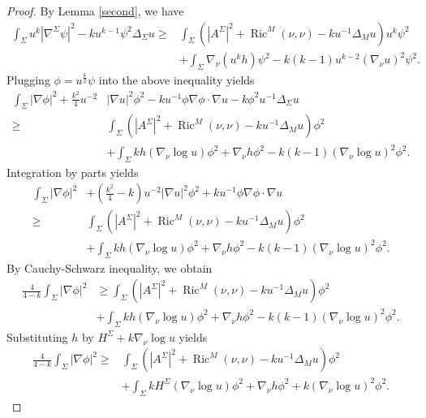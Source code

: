 \documentclass[11pt,letterpaper]{amsart}
\DeclareMathOperator{\Ric}{Ric}
\theoremstyle{definition}
\theoremstyle{remark}
\numberwithin{equation}{section}
\begin{document}
\begin{proof}
By Lemma \ref{second}, we have
\begin{equation*}
 \begin{split}
     \int_{\Sigma}u^k |\nabla^{\Sigma}\psi|^2-ku^{k-1}\psi^2\Delta_{\Sigma}u\geqslant& \int_{\Sigma} \left(|A^{\Sigma}|^2+\Ric^M(\nu, \nu)-ku^{-1}\Delta_M u\right)u^k\psi^2\\
     &+\int_{\Sigma} \nabla_\nu(u^k h)\psi^2-k(k-1)u^{k-2}(\nabla_\nu u)^2\psi^2.
     \end{split}
 \end{equation*}
Plugging $\phi=u^{\frac{k}{2}}\psi$ into the above inequality yields
 \begin{align*}
     \int_\Sigma |\nabla\phi|^2+\frac{k^2}{4}u^{-2}&|\nabla u|^2\phi^2-ku^{-1}\phi\nabla\phi\cdot\nabla u-k\phi^2u^{-1}\Delta_\Sigma u\\ 
     \geq & \int_{\Sigma} \left(|A^{\Sigma}|^2+\Ric^M(\nu, \nu)-ku^{-1}\Delta_M u\right)\phi^2\\
     &+\int_{\Sigma} kh(\nabla_\nu \log u) \phi^2+\nabla_\nu h \phi^2-k(k-1)(\nabla_\nu \log u)^2\phi^2.
 \end{align*}
 Integration by parts yields
 \begin{align*}
     \int_\Sigma |\nabla\phi|^2&+\left(\frac{k^2}{4}-k\right)u^{-2}|\nabla u|^2\phi^2+ku^{-1}\phi\nabla\phi\cdot\nabla u\\ \geq & \int_{\Sigma} \left(|A^{\Sigma}|^2+\Ric^M(\nu, \nu)-ku^{-1}\Delta_M u\right)\phi^2\\
     &+\int_{\Sigma} kh(\nabla_\nu \log u) \phi^2+\nabla_\nu h \phi^2-k(k-1)(\nabla_\nu \log u)^2\phi^2.
 \end{align*}
 By Cauchy-Schwarz inequality, we obtain
  \begin{align*}
    \frac{4}{4-k} \int_\Sigma |\nabla\phi|^2&\geq  \int_{\Sigma} \left(|A^{\Sigma}|^2+\Ric^M(\nu, \nu)-ku^{-1}\Delta_M u\right)\phi^2\\
     &+\int_{\Sigma} kh(\nabla_\nu \log u) \phi^2+\nabla_\nu h \phi^2-k(k-1)(\nabla_\nu \log u)^2\phi^2.
 \end{align*}
Substituting $h$ by $H^{\Sigma}+k\nabla_\nu \log u$ yields
   \begin{align}\label{equation 11}
    \frac{4}{4-k} \int_\Sigma |\nabla\phi|^2\geq & \int_{\Sigma} \left(|A^{\Sigma}|^2+\Ric^M(\nu, \nu)-ku^{-1}\Delta_M u\right)\phi^2\\\nonumber
     &+\int_{\Sigma} k H^{\Sigma}(\nabla_\nu \log u) \phi^2+\nabla_\nu h \phi^2+k(\nabla_\nu \log u)^2\phi^2.
 \end{align}
 

\end{proof}
\end{document}
